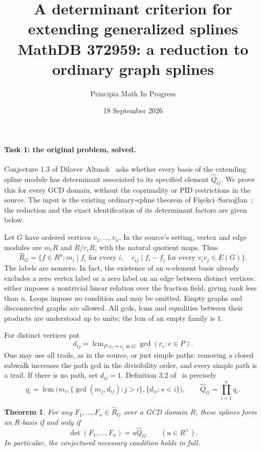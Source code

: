\documentclass[11pt]{article}
\title{A determinant criterion for extending generalized splines\\
\large MathDB 372959: a reduction to ordinary graph splines}
\author{Principia Math In Progress}
\date{18 September 2026}
\newtheorem{theorem}{Theorem}
\newcommand{\lcmop}{\operatorname{lcm}}
\newcommand{\Sph}{\widehat R_G}
\begin{document}
\maketitle

\paragraph{Task 1: the original problem, solved.}
Conjecture 1.3 of Dilaver--Alt\i nok~\cite{DA} asks whether every basis
of the extending spline module has determinant associated to its
specified element $\widehat Q_G$. We prove this for every GCD domain,
without the coprimality or PID restrictions in the source. The input
is the existing ordinary-spline theorem of Fi\c sekci--Sar\i o\u glan~\cite{FS};
the reduction and the exact identification of its determinant factors
are given below.

Let $G$ have ordered vertices $v_1,\ldots,v_n$. In the source's setting,
vertex and edge modules are $m_iR$ and $R/r_eR$, with the natural quotient
maps. Thus
\[
 \Sph=\{f\in R^n:m_i\mid f_i\text{ for every }i,
       \quad r_{ij}\mid f_i-f_j\text{ for every }v_iv_j\in E(G)\}.
\]
The labels are nonzero. In fact, the existence of an $n$-element basis
already excludes a zero vertex label or a zero label on an edge between
distinct vertices: either imposes a nontrivial linear relation over the
fraction field, giving rank less than $n$. Loops impose no condition and
may be omitted. Empty graphs and disconnected graphs are allowed.
All gcds, lcms and equalities between their products are understood up
to units; the lcm of an empty family is $1$.

For distinct vertices put
\[
 d_{ij}=\lcmop_{P:v_i\leadsto v_j\text{ in }G}\gcd(r_e:e\in P).
\]
One may use all trails, as in the source, or just simple paths: removing
a closed subwalk increases the path gcd in the divisibility order, and
every simple path is a trail. If there is no path, set $d_{ij}=1$.
Definition 3.2 of~\cite{DA} is precisely
\begin{equation}\label{eq:Q}
 q_i=\lcmop\bigl(m_i,\{\gcd(m_j,d_{ij}):j>i\},
                         \{d_{is}:s<i\}\bigr),\qquad
 \widehat Q_G=\prod_{i=1}^n q_i.
\end{equation}

\begin{theorem}\label{thm:main}
For any $F_1,\ldots,F_n\in\Sph$ over a GCD domain $R$, these splines
form an $R$-basis if and only if
\[
 \det(F_1,\ldots,F_n)=u\widehat Q_G\qquad(u\in R^\times).
\]
In particular, the conjectured necessary condition holds in full.
\end{theorem}
\end{document}
